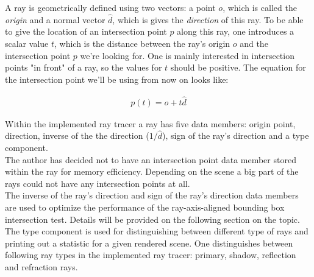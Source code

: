 \documentclass{article}
\begin{document}
A ray is geometrically defined using two vectors: a point $o$, which is called the \textit{origin} and a normal vector $\hat{d}$, which is gives the \textit{direction} of this ray. To be able to give the location of an intersection point $p$ along this ray, one introduces a scalar value $t$, which is the distance between the ray's origin $o$ and the intersection point $p$ we're looking for. One is mainly interested in intersection points "in front" of a ray, so the values for $t$ should be positive. The equation for the intersection point we'll be using from now on looks like: \cite{rftgu}

\begin{align}
	p(t) = o + t\hat{d}
\end{align}

Within the implemented ray tracer a ray has five data members: origin point, direction, inverse of the the direction ($1 / \hat{d}$), sign of the ray's direction and a type component. \\
The author has decided not to have an intersection point data member stored within the ray for memory efficiency. Depending on the scene a big part of the rays could not have any intersection points at all.\\
The inverse of the ray's direction and sign of the ray's direction data members are used to optimize the performance of the ray-axis-aligned bounding box intersection test. Details will be provided on the following section on the topic.\\
The type component is used for distinguishing between different type of rays and printing out a statistic for a given rendered scene. One distinguishes between following ray types in the implemented ray tracer: primary, shadow, reflection and refraction rays.








\end{document}
